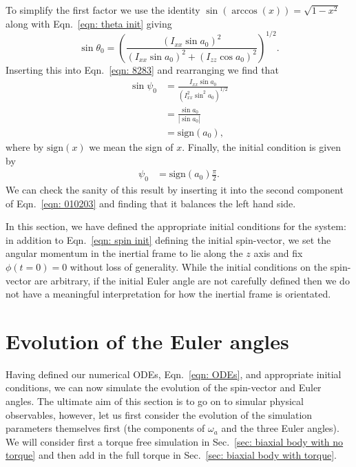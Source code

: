 \documentclass[../full_thesis/full_thesis.tex]{subfiles}
\begin{document}
To simplify the first factor we use the identity $\sin(\arccos(x)) = \sqrt{1 - x^{2}}$
along with Eqn.~\eqref{eqn:  theta init} giving
\begin{equation}
\sin\theta_{0} = \left(\frac{(I_{xx}\sin a_{0})^{2}}
                  {(I_{xx}\sin a_{0})^{2} + (I_{zz}\cos a_{0})^{2}} \right)^{1/2}.
\end{equation}
Inserting this into Eqn.~\eqref{eqn: 8283} and rearranging we find that
\begin{align}
\sin \psi_0 & = \frac{I_{xx} \sin a_{0}}{\left(I_{xx}^{2} \sin^{2} a_{0}\right)^{1/2}} \\
 & = \frac{\sin a_{0} }{|\sin a_{0}|} \\
& = \mathrm{sign}(a_{0}),
\end{align}
where by $\mathrm{sign}(x)$ we mean the sign of $x$. Finally, the initial
condition is given by
\begin{align}
\psi_{0} & =\mathrm{sign}(a_{0}) \frac{\pi}{2}.
\label{eqn: psi  init}
\end{align}
We can check the sanity of this result by inserting it into the second component of
Eqn.~\eqref{eqn: 010203} and finding that it balances the left hand side.

In this section, we have defined the appropriate initial conditions for the
system: in addition to Eqn.~\eqref{eqn: spin init} defining the initial spin-vector,
we set the angular momentum in the inertial frame to lie along the
$z$ axis and fix $\phi(t=0)=0$ without loss of generality.  While the
initial conditions on the spin-vector are arbitrary, if the initial Euler angle
are not carefully defined then we do not have a meaningful interpretation for
how the inertial frame is orientated.

\section{Evolution of the Euler angles}

Having defined our numerical ODEs, Eqn.~\eqref{eqn: ODEs}, and appropriate
initial conditions, we can now simulate the evolution of the spin-vector and
Euler angles. The ultimate aim of this section is to go on to simular physical
observables, however, let us first consider the evolution of the simulation
parameters themselves first (the components of $\omega_a$ and the three Euler
angles). We will consider first a torque free simulation in Sec.~\ref{sec:
biaxial body with no torque} and then add in the full torque in Sec.~\ref{sec:
biaxial body with torque}.
\end{document}
